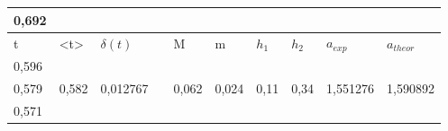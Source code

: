 \documentclass[a4paper,12pt]{article}
\begin{document}
\begin{table}[htp]
\begin{tabular}{@{}|l|l|l|l|l|l|l|l|l|l|@{}}
0,692 &                            &                           &                            &                        &                        &                       &                       & \multicolumn{1}{l}{}                          & \multicolumn{1}{r}{}                          \\\hline
t     & \textless{}t\textgreater{} & $\delta(t)$               &                            & M                      & m                      & $h_1$                 & $h_2$                 & \multicolumn{1}{l}{$a_{exp}$}                 & $a_{theor}$                                   \\\hline
0,596 & \multirow{3}{*}{0,582}     & \multirow{3}{*}{0,012767} &                            & \multirow{3}{*}{0,062} & \multirow{3}{*}{0,024} & \multirow{3}{*}{0,11} & \multirow{3}{*}{0,34} & \multirow{3}{*}{1,551276}                     & \multirow{3}{*}{1,590892}                     \\
0,579 &                            &                           &                            &                        &                        &                       &                       &                                               &                                               \\
0,571 &                            &                           &                            &                        &                        &                       &                       &                                               &                                               \\ \hline
\end{tabular}
\end{table}
\end{document}

